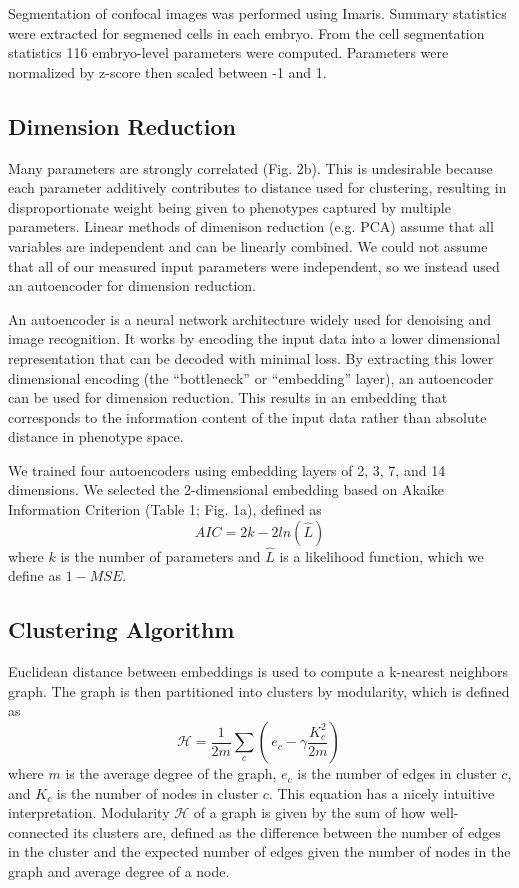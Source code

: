 \documentclass{article}
\begin{document}
Segmentation of confocal images was performed using Imaris. Summary statistics were extracted for segmened cells in each embryo. From the cell segmentation statistics 116 embryo-level parameters were computed. Parameters were normalized by z-score then scaled between -1 and 1.

\subsection{Dimension Reduction}

Many parameters are strongly correlated (Fig. 2b). This is undesirable because each parameter additively contributes to distance used for clustering, resulting in disproportionate weight being given to phenotypes captured by multiple parameters. Linear methods of dimenison reduction (e.g. PCA) assume that all variables are independent and can be linearly combined. We could not assume that all of our measured input parameters were independent, so we instead used an autoencoder for dimension reduction.

An autoencoder is a neural network architecture widely used for denoising and image recognition. It works by encoding the input data into a lower dimensional representation that can be decoded with minimal loss. By extracting this lower dimensional encoding (the ``bottleneck'' or ``embedding'' layer), an autoencoder can be used for dimension reduction\cite{WANG2016232}. This results in an embedding that corresponds to the information content of the input data rather than absolute distance in phenotype space.

We trained four autoencoders using embedding layers of 2, 3, 7, and 14 dimensions. We selected the 2-dimensional embedding based on Akaike Information Criterion\cite{cavanaugh2019akaike} (Table 1; Fig. 1a), defined as 
\begin{equation}
AIC = 2k - 2ln(\hat{L}) 
\end{equation}
where $k$ is the number of parameters and $\hat{L}$ is a likelihood function, which we define as $1 - MSE$.

\subsection{Clustering Algorithm}
Euclidean distance between embeddings is used to compute a k-nearest neighbors graph. The graph is then partitioned into clusters by modularity\cite{PhysRevE.74.016110}, which is defined as 
\begin{equation}
 \mathcal{H} = \frac{1}{2m}\sum_{c}( \,e_c - \gamma\frac{K_c^2}{2m}) \, 
\end{equation}
 where $m$ is the average degree of the graph, $e_c$ is the number of edges in cluster $c$, and $K_c$ is the number of nodes in cluster $c$. This equation has a nicely intuitive interpretation. Modularity $\mathcal{H}$ of a graph is given by the sum of how well-connected its clusters are, defined as the difference between the number of edges in the cluster and the expected number of edges given the number of nodes in the graph and average degree of a node.
\end{document}
